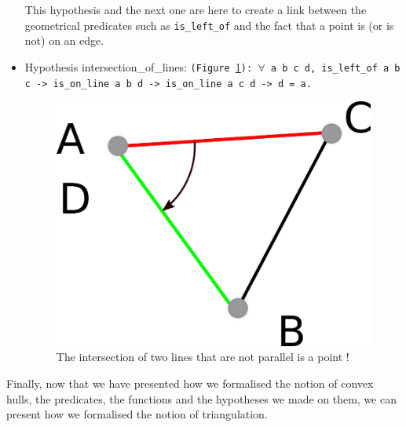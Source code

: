 \documentclass[a4paper,10pt]{article}
\def\hypothesis#1#2{{\color{purple}Hypothesis} {\color{blue}#1}: {\tt #2}}
\begin{document}
\begin{itemize}
         This hypothesis and the next one are here to create a link between the geometrical predicates such as {\tt is\_left\_of} and the fact that a point is (or is not) on an edge.
       \item \hypothesis{intersection\_of\_lines}{(Figure \ref{intersection_line}):
            $\forall$ a b c d,
is\_left\_of a b c -> is\_on\_line a b d ->
is\_on\_line a c d -> d = a.}
\\\begin{figure}
\centering
\includegraphics[scale=2]{il}
\caption{\label{intersection_line} The intersection of two lines that are not parallel is a point !}
\end{figure}
\end{itemize}

Finally, now that we have presented how we formalised the notion of convex hulls, the predicates, the functions and the hypotheses we made on them, we can present how we formalised the notion of triangulation.
\end{document}
